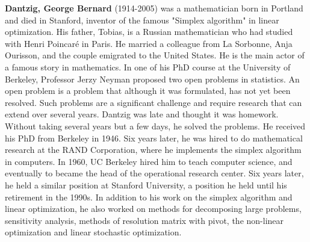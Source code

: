\textbf{Dantzig, George Bernard} (1914-2005) was a mathematician born in Portland and died in Stanford, inventor of the famous "Simplex algorithm" in linear optimization. His father, Tobias, is a Russian mathematician who had studied with Henri Poincaré in Paris. He married a colleague from La Sorbonne, Anja Ourisson, and the couple emigrated to the United States. He is the main actor of a famous story in mathematics. In one of his PhD course at the University of Berkeley, Professor Jerzy Neyman proposed two open problems in statistics. An open problem is a problem that although it was formulated, has not yet been resolved. Such problems are a significant challenge and require research that can extend over several years. Dantzig was late and thought it was homework. Without taking several years but a few days, he solved the problems. He received his PhD from Berkeley in 1946. Six years later, he was hired to do mathematical research at the RAND Corporation, where he implements the simplex algorithm in computers. In 1960, UC Berkeley hired him to teach computer science, and eventually to became the head of the operational research center. Six years later, he held a similar position at Stanford University, a position he held until his retirement in the 1990s. In addition to his work on the simplex algorithm and linear optimization, he also worked on methods for decomposing large problems, sensitivity analysis, methods of resolution matrix with pivot, the non-linear optimization and linear stochastic optimization.

